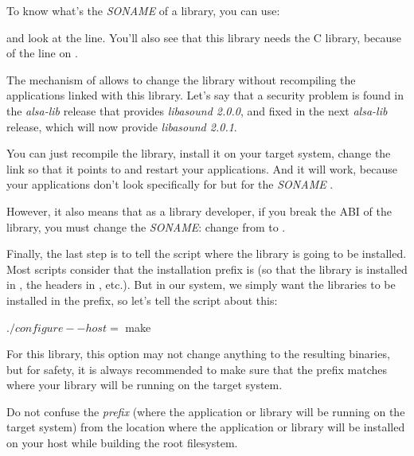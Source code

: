To know what's the {\em SONAME} of a library, you can use:

\begin{bashinput}
$ %
\end{bashinput}

and look at the  line. You'll also see that this
library needs the C library, because of the  line on
.

The mechanism of  allows to change the library without
recompiling the applications linked with this library. Let's say that
a security problem is found in the {\em alsa-lib} release that provides
{\em libasound 2.0.0}, and fixed in the next {\em alsa-lib} release, which will
now provide {\em libasound 2.0.1}.

You can just recompile the library, install it on your target system,
change the  link so that it points to
 and restart your applications. And it will
work, because your applications don't look specifically for
 but for the {\em SONAME}
.

However, it also means that as a library developer, if you break the
ABI of the library, you must change the {\em SONAME}: change from
 to .

Finally, the last step is to tell the  script where the
library is going to be installed. Most  scripts consider that
the installation prefix is  (so that the library is
installed in , the headers in
, etc.). But in our system, we simply want
the libraries to be installed in the  prefix, so let's tell
the  script about this:

\begin{bashinput}
$ ./configure --host=%
$ make
\end{bashinput}

For this library, this option may not change anything to the resulting
binaries, but for safety, it is always recommended to make sure that
the prefix matches where your library will be running on the target
system.

Do not confuse the {\em prefix} (where the application or library will
be running on the target system) from the location where the
application or library will be installed on your host while building
the root filesystem.

